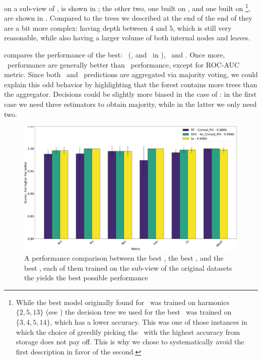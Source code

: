 on a sub-view of \an, is shown in ; the other two, one built on \bn, and one
built on \cnmod\footnote{
	While the best model originally found for \cnmod\ was trained on harmonics $\{2, 5, 13\}$
	(see ) the decision tree we used for the best \ta\ was trained on $\{3,
		4, 5, 14\}$, which has a lower accuracy. This was one of those instances in which
	the choice of greedily picking the \dt\ with the highest accuracy from storage does
	not pay off. This is why we chose to systematically avoid the first description in favor of
	the second.
}, are shown in . Compared to the trees we described at the end
of the end of  they are a bit more complex: having depth between $4$ and $5$, which
is still very reasonable, while also having a larger volume of both internal nodes and leaves.

 compares the performance of the best: \ta\ (\an, \bn and \cnmod\ in
), \rf\ and \svc. Once more, \ta\ performance are generally better
than \rf\ performance, except for ROC-AUC metric. Since both \ta\ and \rf\
predictions are aggregated via majority voting, we could explain this odd
behavior by highlighting that the forest contains more trees than the aggregator. Decisions could be slightly more biased in the case of \ta: in the first case we need
three estimators to obtain majority, while in the latter we only need two.
\begin{figure}[!ht]
	\centering
	\includegraphics[width=\linewidth]{img/best_rf_ta_svc_compared.png}
	\caption{A performance comparison between the best \rf, the best \svc, and the best \ta,
		each of them trained on the sub-view of the original datasets the yields the best possible
		performance} \label{fig:ta-rf-svc-comparison}
\end{figure}

